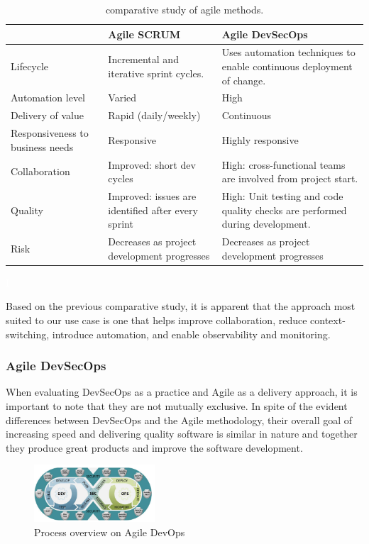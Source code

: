 \begin{table}[h!]
\center
\begin{tabular}[b]{|m{4cm}|m{5cm}|m{5cm}|}
\hline
\rowcolor{white}
 &  Agile SCRUM   & Agile DevSecOps  \\
\hline
 Lifecycle  
& Incremental and iterative sprint cycles. 
& Uses automation techniques to enable continuous deployment of change. \\
\hline
 Automation level  
&  Varied 
& High 
 \\
\hline
 Delivery of value 
&  Rapid (daily/weekly) 
& Continuous  \\
\hline
 Responsiveness to business needs 
&  Responsive 
& Highly responsive   \\
\hline
 Collaboration 
& Improved: short dev cycles 
& High: cross-functional teams are involved from project start. \\
\hline
Quality 
& Improved: issues are identified after every sprint 
& High: Unit testing and code quality checks are performed during development. \\
\hline
 Risk 
&  Decreases as project development progresses 
& Decreases as project development progresses \\
\hline
\end{tabular}
\caption{comparative study of agile methods.}
\textcolor{white}{I} \label{tab:tab-m}
\end{table}

\hspace{7mm}Based on the previous comparative study, it is apparent that the approach most suited to our use case is one that helps improve collaboration, reduce context-switching, introduce automation, and enable observability and monitoring.

\subsubsection{Agile DevSecOps }

\hspace{7mm}When evaluating DevSecOps as a practice and Agile as a delivery approach, it is important to note that they are not mutually exclusive. In spite of the evident differences between DevSecOps and the Agile methodology, their overall goal of increasing speed and delivering quality software is similar in nature and together they produce great products and improve the software development.

\begin{figure}[!ht]\centering
\includegraphics[width=0.4\textwidth,angle=00]{assets/f1.png}
\caption{Process overview on Agile DevOps}
\label{fig:processOverview}
\end{figure}

